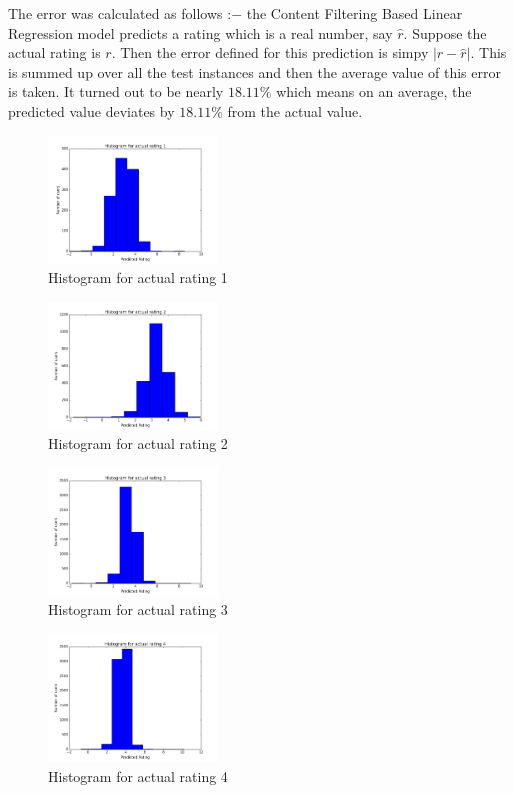 \documentclass[twocolumn]{article}
\begin{document}
\newline
The error was calculated as follows :$-$ the Content Filtering Based Linear Regression model predicts a rating which is a real number, say $\hat{r}$. Suppose the actual rating is $r$. Then the error defined for this prediction is simpy $|r-\hat{r}|$. This is summed up over all the test instances and then the average value of this error is taken. It turned out to be nearly $18.11 \%$ which means on an average, the predicted value deviates by $18.11 \%$ from the actual value.
\begin{figure}
\centering
\includegraphics[width=0.4\textwidth]{hist_1.png}
\caption{Histogram for actual rating 1}
\end{figure}
\begin{figure}
\centering
\includegraphics[width=0.4\textwidth]{hist_2.png}
\caption{Histogram for actual rating 2}
\end{figure}
\begin{figure}
\centering
\includegraphics[width=0.4\textwidth]{hist_3.png}
\caption{Histogram for actual rating 3}
\end{figure}
\begin{figure}
\centering
\includegraphics[width=0.4\textwidth]{hist_4.png}
\caption{Histogram for actual rating 4}
\end{figure}
\end{document}
